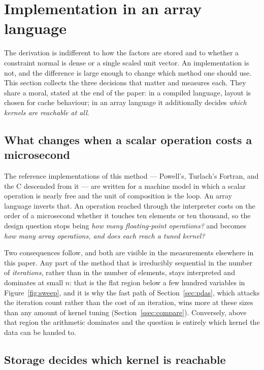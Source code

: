 \section{Implementation in an array language}
\label{sec:implementation}

The derivation is indifferent to how the factors are stored and to whether a
constraint normal is dense or a single scaled unit vector. An implementation is
not, and the difference is large enough to change which method one should use.
This section collects the three decisions that matter and measures each. They
share a moral, stated at the end of the paper: in a compiled language, layout is
chosen for cache behaviour; in an array language it additionally decides
\emph{which kernels are reachable at all}.

\subsection{What changes when a scalar operation costs a microsecond}

The reference implementations of this method --- Powell's, Turlach's Fortran, and
the C descended from it --- are written for a machine model in which a scalar
operation is nearly free and the unit of composition is the loop. An array
language inverts that. An operation reached through the interpreter costs on the
order of a microsecond whether it touches ten elements or ten thousand, so the
design question stops being \emph{how many floating-point operations?} and becomes
\emph{how many array operations, and does each reach a tuned kernel?}

Two consequences follow, and both are visible in the measurements elsewhere in
this paper. Any part of the method that is irreducibly sequential in the number of
\emph{iterations}, rather than in the number of elements, stays interpreted and
dominates at small $n$: that is the flat region below a few hundred variables in
Figure~\ref{fig:sweep}, and it is why the fast path of Section~\ref{sec:pdas},
which attacks the iteration count rather than the cost of an iteration, wins more
at these sizes than any amount of kernel tuning (Section~\ref{ssec:compare}).
Conversely, above that region the arithmetic dominates and the question is
entirely which kernel the data can be handed to.

\subsection{Storage decides which kernel is reachable}
\label{ssec:packed}

